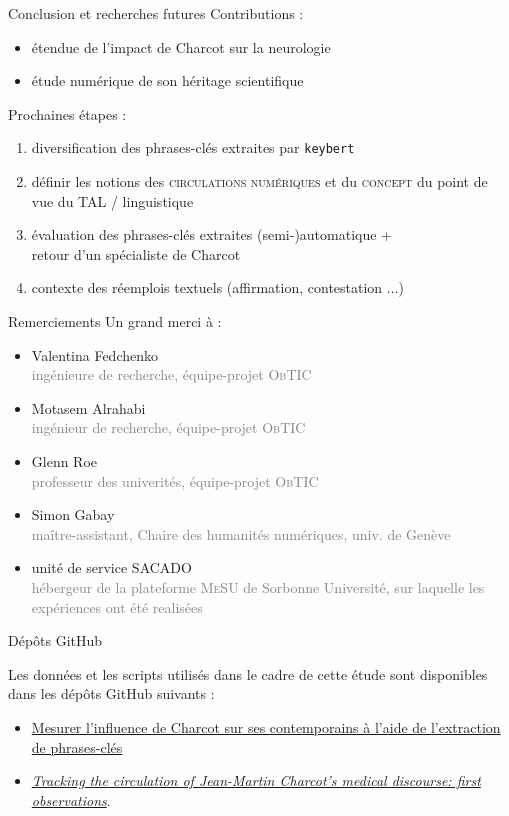 \begin{frame}{Conclusion et recherches futures}
Contributions :
\begin{itemize}
\item étendue de l'impact de Charcot sur la neurologie
\item étude numérique de son héritage scientifique
\end{itemize}
\bigskip
Prochaines étapes :
\begin{enumerate}
\item diversification des phrases-clés extraites par \texttt{keybert}
\item définir les notions des \textsc{circulations numériques} et du \textsc{concept} du point de vue du \textsc{TAL} / linguistique
\item évaluation des phrases-clés extraites (semi-)automatique +  \\
retour d'un spécialiste de Charcot 
\item contexte des réemplois textuels (affirmation, contestation $\dots$)
\end{enumerate} 
\end{frame}


\begin{frame}{Remerciements}
Un grand merci à :
\begin{itemize}
\item Valentina Fedchenko\\
{\small \textcolor{gray}{ingénieure de recherche, équipe-projet \textsc{ObTIC}}}
\item Motasem Alrahabi\\
{\small \textcolor{gray}{ingénieur de recherche, équipe-projet \textsc{ObTIC}}}
\item Glenn Roe\\
{\small \textcolor{gray}{professeur des univerités, équipe-projet \textsc{ObTIC}}}
\item Simon Gabay\\
{\small \textcolor{gray}{maître-assistant, Chaire des humanités numériques, univ. de Genève}}
\item unité de service \textsc{SACADO}\\
{\small \textcolor{gray}{hébergeur de la plateforme \textsc{MeSU} de Sorbonne Université, sur laquelle les expériences ont été realisées}}
\end{itemize}
\end{frame}

\begin{frame}{Dépôts GitHub}
\begin{center}
Les données et les scripts utilisés dans le cadre de cette étude sont disponibles dans les dépôts GitHub suivants :
\begin{itemize}
\small
\item \href{https://github.com/ljpetkovic/JE\_IA\_HN\_030524}{Mesurer l’influence de Charcot sur ses contemporains à l’aide de l’extraction de phrases-clés}
\item \href{https://github.com/ljpetkovic/Charcot\_circulations}{\textit{Tracking the circulation of Jean-Martin Charcot’s medical discourse: first observations}}.
\end{itemize} 
\end{center}
\end{frame}